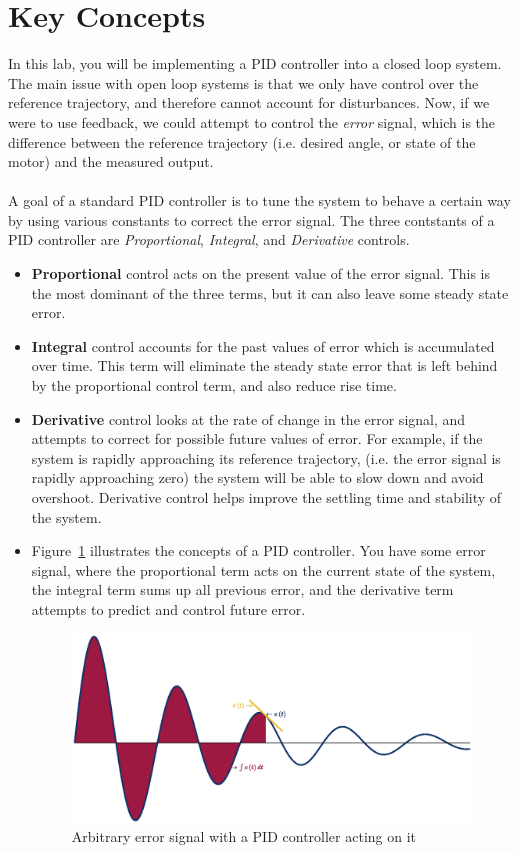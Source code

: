 \section{Key Concepts}
In this lab, you will be implementing a PID controller into a closed loop 
system. The main issue with open loop systems is that we only have 
control over the reference trajectory, and therefore cannot account for 
disturbances. Now, if we were to use feedback, we could attempt to control 
the \emph{error} signal, which is the difference between the reference 
trajectory (i.e. desired angle, or state of the motor) and the measured output.\\
\\
A goal of a standard PID controller is to  tune the system to behave a certain 
way by using various constants to correct the error signal. The three contstants 
of a PID controller are \emph{Proportional}, \emph{Integral}, and \emph{Derivative}
controls. 
\begin{itemize}
\item \textbf{Proportional} control acts on the present value of the error signal. This is the most 
dominant of the three terms, but it can also leave some steady state error. 
\item\textbf{Integral} control accounts for the past values of error which is accumulated over time. 
This term will eliminate the steady state error that is left behind by the proportional control 
term, and also reduce rise time. 
\item \textbf{Derivative} control looks at the rate of change in the error signal, and attempts to 
correct for possible future values of error. For example, if the system is rapidly approaching 
its reference trajectory, (i.e. the error signal is rapidly approaching zero) the system will be 
able to slow down and avoid overshoot. Derivative control helps improve the settling time and 
stability of the system. 
\item Figure~\ref{fig:PIDExp} illustrates the concepts of a PID controller. You have some error 
signal, where the proportional term acts on the current state of the system, the integral term 
sums up all previous error, and the derivative term attempts to predict and control future error. 

\begin{figure}
\centering
\includegraphics[width = 0.8\hsize]{pix/PIDSchematic.eps}
\caption{Arbitrary error signal with a PID controller acting on it}\label{fig:PIDExp}
\end{figure}

\end{itemize}
